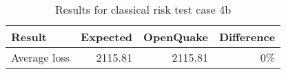 \begin{table}[htbp]

\centering
\begin{tabular}{ l r r r }

\hline
\rowcolor{anti-flashwhite}
\bf{Result} & \bf{Expected} & \bf{OpenQuake} & \bf{Difference}\\
\hline
Average loss & 2115.81 & 2115.81 & 0\% \\
\hline
\end{tabular}

\caption{Results for classical risk test case 4b}
\label{tab:result-classical-risk-4b}
\end{table}